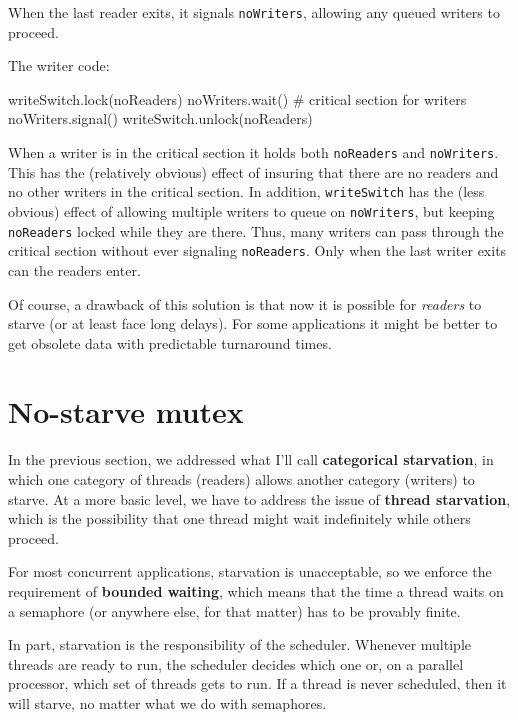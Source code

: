 \documentclass{book}
\begin{document}
When the last reader exits, it signals {\tt noWriters},
allowing any queued writers to proceed.

The writer code:

\begin{unbreakable}[title={Writer-priority writer solution}]{}
writeSwitch.lock(noReaders)
    noWriters.wait()
        # critical section for writers
    noWriters.signal()
writeSwitch.unlock(noReaders)
\end{unbreakable}

When a writer is in the critical section it holds both
    {\tt noReaders} and {\tt noWriters}.  This has the
(relatively obvious) effect of insuring that there are
no readers and no other writers in the critical section.
In addition, {\tt writeSwitch} has the (less obvious) effect of
allowing multiple writers to queue on {\tt noWriters},
but keeping {\tt noReaders} locked while they are
there.  Thus, many writers can pass through the critical
section without ever signaling
    {\tt noReaders}.  Only when the last writer exits can
the readers enter.

Of course, a drawback of this solution is that now it is
possible for {\em readers} to starve (or at least face long
delays).  For some applications it might be better to get
obsolete data with predictable turnaround times.




\section{No-starve mutex}
\label{props}

In the previous section, we addressed what I'll call
    {\bf categorical starvation}, in which one category of threads
(readers) allows another category (writers) to starve.
At a more basic level, we have to address the issue of
    {\bf thread starvation}, which is the possibility that one
thread might wait indefinitely while others proceed.

For most concurrent applications, starvation is unacceptable,
so we enforce the requirement of {\bf bounded waiting}, which
means that the time a thread waits on a semaphore (or anywhere
else, for that matter) has to be provably finite.

In part, starvation is the responsibility of the scheduler.
Whenever multiple threads are ready to run, the scheduler decides
which one or, on a parallel processor, which set of threads gets
to run.  If a thread is never scheduled, then it will starve,
no matter what we do with semaphores.
\end{document}
